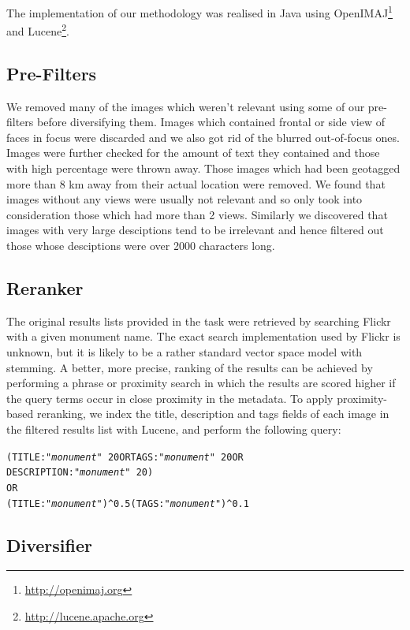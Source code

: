 \documentclass{../acm_proc_article-me11_tweaked}
\begin{document}
The implementation of our methodology was realised in Java using OpenIMAJ\footnote{\url{http://openimaj.org}}~\cite{Hare:2011:OIJ:2072298.2072421} and Lucene\footnote{\url{http://lucene.apache.org}}. 

\subsection{Pre-Filters}

We removed many of the images which weren't relevant using some of our pre-filters before diversifying them. Images which contained frontal or side view of faces in focus were discarded and we also got rid of the blurred out-of-focus ones. Images were further checked for the amount of text they contained and those with high percentage were thrown away. Those images which had been geotagged more than 8 km away from their actual location were removed. We found that images without any views were usually not relevant and so only took into consideration those which had more than 2 views. Similarly we discovered that images with very large desciptions tend to be irrelevant and hence filtered out those whose desciptions were over 2000 characters long.

\subsection{Reranker}
The original results lists provided in the task were retrieved by searching Flickr with a given monument name. The exact search implementation used by Flickr is unknown, but it is likely to be a rather standard vector space model with stemming. A better, more precise, ranking of the results can be achieved by performing a phrase or proximity search in which the results are scored higher if the query terms occur in close proximity in the metadata. To apply proximity-based reranking, we index the title, description and tags fields of each image in the filtered results list with Lucene, and perform the following query:
\begin{alltt}
\textrm
(TITLE:"\emph{monument}"~20 OR TAGS:"\emph{monument}"~20 OR 
    DESCRIPTION:"\emph{monument}"~20)
OR
    (TITLE:"\emph{monument}")^0.5 (TAGS:"\emph{monument}")^0.1
\end{alltt}

\subsection{Diversifier}
\end{document}
